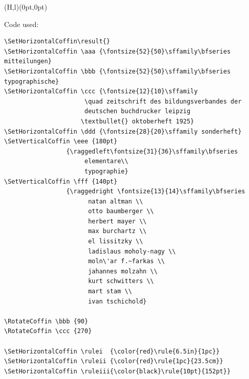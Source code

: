 \documentclass{article}
\begin{document}
\newpage

\TypesetCoffin \result (H,l)(0pt,0pt)

\newpage

\vspace*{3cm}
\begin{center}
  {\Large Code used: \par}
\vspace*{1cm}


\begin{minipage}{14cm}
\begin{verbatim}
\SetHorizontalCoffin\result{}
\SetHorizontalCoffin \aaa {\fontsize{52}{50}\sffamily\bfseries mitteilungen}
\SetHorizontalCoffin \bbb {\fontsize{52}{50}\sffamily\bfseries typographische}
\SetHorizontalCoffin \ccc {\fontsize{12}{10}\sffamily 
                      \quad zeitschrift des bildungsverbandes der
                      deutschen buchdrucker leipzig 
                     \textbullet{} oktoberheft 1925}
\SetHorizontalCoffin \ddd {\fontsize{28}{20}\sffamily sonderheft}
\SetVerticalCoffin \eee {180pt}
                 {\raggedleft\fontsize{31}{36}\sffamily\bfseries 
                      elementare\\
                      typographie}
\SetVerticalCoffin \fff {140pt}
                 {\raggedright \fontsize{13}{14}\sffamily\bfseries 
                       natan altman \\
                       otto baumberger \\
                       herbert mayer \\
                       max burchartz \\
                       el lissitzky \\
                       ladislaus moholy-nagy \\
                       moln\'ar f.~farkas \\
                       jahannes molzahn \\
                       kurt schwitters \\
                       mart stam \\
                       ivan tschichold}
     
\RotateCoffin \bbb {90}
\RotateCoffin \ccc {270}

\SetHorizontalCoffin \rulei  {\color{red}\rule{6.5in}{1pc}}
\SetHorizontalCoffin \ruleii {\color{red}\rule{1pc}{23.5cm}}
\SetHorizontalCoffin \ruleiii{\color{black}\rule{10pt}{152pt}}


\end{verbatim}
\end{minipage}
\end{center}
\end{document}
